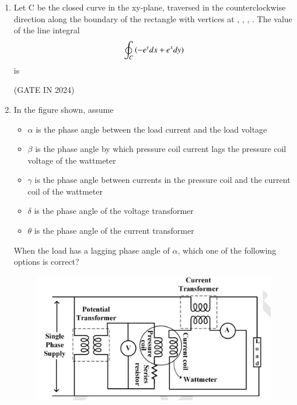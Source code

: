 \documentclass[journal,12pt,onecolumn]{IEEEtran}
\theoremstyle{remark}
\begin{document}
\begin{enumerate}
    \item Let C be the closed curve in the xy-plane, traversed in the counterclockwise direction along the boundary of the rectangle with vertices at , , , . The value of the line integral
    \begin{align*}
        \oint_C \left(-e^y dx + e^x dy\right)
    \end{align*}
    is
    
    \hfill{(GATE IN 2024)}
    \begin{enumerate}
    \end{enumerate}
    
    \item In the figure shown,  assume
    \begin{itemize}
        \item $\alpha$ is the phase angle between the load current and the load voltage
        \item $\beta$ is the phase angle by which pressure coil current lags the pressure coil voltage of the wattmeter
        \item $\gamma$ is the phase angle between currents in the pressure coil and the current coil of the wattmeter
        \item $\delta$ is the phase angle of the voltage transformer
        \item $\theta$ is the phase angle of the current transformer
    \end{itemize}
    When the load has a lagging phase angle of $\alpha$, which one of the following options is correct?
    \begin{figure}[H]
        \centering
        \includegraphics[width=0.8\columnwidth]{figs/p24.jpg}
        \caption*{}
        \label{fig:p24}
    \end{figure}
    

\end{enumerate}
\end{document}
